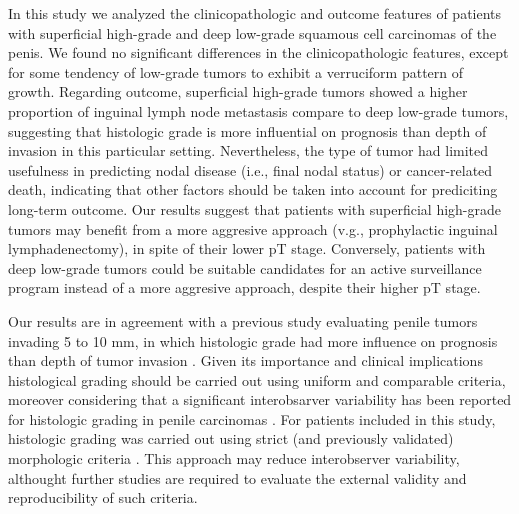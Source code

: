 \documentclass[11pt,letterpaper]{article}\usepackage[]{graphicx}\usepackage[]{color}
\begin{document}
\begin{multicols}{2}
In this study we analyzed the clinicopathologic and outcome features of patients with superficial high-grade and deep low-grade squamous cell carcinomas of the penis. We found no significant differences in the clinicopathologic features, except for some tendency of low-grade tumors to exhibit a verruciform pattern of growth. Regarding outcome, superficial high-grade tumors showed a higher proportion of inguinal lymph node metastasis compare to deep low-grade tumors, suggesting that histologic grade is more influential on prognosis than depth of invasion in this particular setting. Nevertheless, the type of tumor had limited usefulness in predicting nodal disease (i.e., final nodal status) or cancer-related death, indicating that other factors should be taken into account for prediciting long-term outcome. Our results suggest that patients with superficial high-grade tumors may benefit from a more aggresive approach (v.g., prophylactic inguinal lymphadenectomy), in spite of their lower pT stage. Conversely, patients with deep low-grade tumors could be suitable candidates for an active surveillance program instead of a more aggresive approach, despite their higher pT stage.

Our results are in agreement with a previous study evaluating penile tumors invading 5 to 10 mm, in which histologic grade had more influence on prognosis than depth of tumor invasion \cite{Velazquez2008}. Given its importance and clinical implications histological grading should be carried out using uniform and comparable criteria, moreover considering that a significant interobsarver variability has been reported for histologic grading in penile carcinomas \cite{Naumann2009}. For patients included in this study, histologic grading was carried out using strict (and previously validated) morphologic criteria \cite{Chaux2009b}. This approach may reduce interobserver variability, althought further studies are required to evaluate the external validity and reproducibility of such criteria.


\end{multicols}
\end{document}
